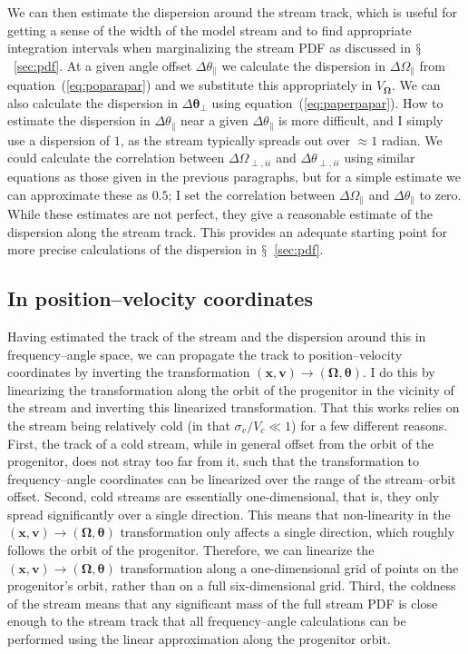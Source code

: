 \documentclass{emulateapj}
\newcommand{\eqnname}{equation}
\newcommand{\equationname}{\eqnname}
\newcommand{\sectionname}{$\mathsection$}
\renewcommand{\vec}[1]{\ensuremath{\mathbf{#1}}}
\newcommand{\vecx}{\ensuremath{\vec{x}}}
\newcommand{\vecv}{\ensuremath{\vec{v}}}
\newcommand{\veco}{\ensuremath{\vec{\Omega}}}
\newcommand{\veca}{\ensuremath{\boldsymbol\theta}}
\newcommand{\sigv}{\ensuremath{\sigma_v}}
\newcommand{\apar}{\ensuremath{\theta_\parallel}}
\newcommand{\opar}{\ensuremath{\Omega_\parallel}}
\newcommand{\aperp}{\ensuremath{\veca_\perp}}
\newcommand{\aperpii}{\ensuremath{\theta_{\perp,ii}}}
\newcommand{\operpii}{\ensuremath{\Omega_{\perp,ii}}}
\begin{document}
We can then estimate the dispersion around the stream track, which is
useful for getting a sense of the width of the model stream and to
find appropriate integration intervals when marginalizing the stream
PDF as discussed in \sectionname~\ref{sec:pdf}. At a given angle
offset $\Delta \apar$ we calculate the dispersion in $\Delta \opar$
from \equationname~(\ref{eq:poparapar}) and we substitute this
appropriately in $V_\veco$. We can also calculate the dispersion in
$\Delta \aperp$ using \equationname~(\ref{eq:paperpapar}). How to
estimate the dispersion in $\Delta \apar$ near a given $\Delta \apar$
is more difficult, and I simply use a dispersion of $1$, as the stream
typically spreads out over $\approx 1$ radian. We could calculate the
correlation between $\Delta \operpii$ and $\Delta \aperpii$ using
similar equations as those given in the previous paragraphs, but for a
simple estimate we can approximate these as $0.5$; I set the
correlation between $\Delta \opar$ and $\Delta \apar$ to zero. While
these estimates are not perfect, they give a reasonable estimate of
the dispersion along the stream track. This provides an adequate
starting point for more precise calculations of the dispersion in
\sectionname~\ref{sec:pdf}.

\subsection{In position--velocity coordinates}\label{sec:trackxv}

Having estimated the track of the stream and the dispersion around
this in frequency--angle space, we can propagate the track to
position--velocity coordinates by inverting the transformation
$(\vecx,\vecv) \rightarrow (\veco,\veca)$. I do this by linearizing
the transformation along the orbit of the progenitor in the vicinity
of the stream and inverting this linearized transformation. That this
works relies on the stream being relatively cold (in that $\sigv/V_c
\ll 1$) for a few different reasons. First, the track of a cold
stream, while in general offset from the orbit of the progenitor, does
not stray too far from it, such that the transformation to
frequency--angle coordinates can be linearized over the range of the
stream--orbit offset. Second, cold streams are essentially
one-dimensional, that is, they only spread significantly over a single
direction. This means that non-linearity in the $(\vecx,\vecv)
\rightarrow (\veco,\veca)$ transformation only affects a single
direction, which roughly follows the orbit of the
progenitor. Therefore, we can linearize the $(\vecx,\vecv) \rightarrow
(\veco,\veca)$ transformation along a one-dimensional grid of points
on the progenitor's orbit, rather than on a full six-dimensional
grid. Third, the coldness of the stream means that any significant
mass of the full stream PDF is close enough to the stream track that
all frequency--angle calculations can be performed using the linear
approximation along the progenitor orbit.
\end{document}
